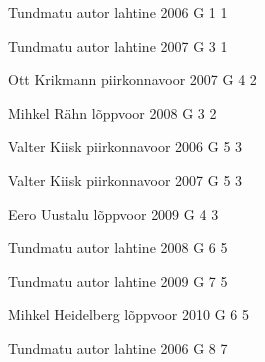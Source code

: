 \documentclass[11pt]{article}
\begin{document}
{Tundmatu autor} %
{lahtine} %
{2006} %
{G 1} %
{1} %
{

\ifEngHint
\fi
}

{Tundmatu autor} %
{lahtine} %
{2007} %
{G 3} %
{1} %
{

\ifEngHint
\fi
}

{Ott Krikmann} %
{piirkonnavoor} %
{2007} %
{G 4} %
{2} %
{

\ifEngHint
\fi
}

{Mihkel Rähn} %
{lõppvoor} %
{2008} %
{G 3} %
{2} %
{

\ifEngHint
\fi
}

{Valter Kiisk} %
{piirkonnavoor} %
{2006} %
{G 5} %
{3} %
{

\ifEngHint
\fi
}

{Valter Kiisk} %
{piirkonnavoor} %
{2007} %
{G 5} %
{3} %
{

\ifEngHint
\fi
}

{Eero Uustalu} %
{lõppvoor} %
{2009} %
{G 4} %
{3} %
{

\ifEngHint
\fi
}

{Tundmatu autor} %
{lahtine} %
{2008} %
{G 6} %
{5} %
{

\ifEngHint
\fi
}

{Tundmatu autor} %
{lahtine} %
{2009} %
{G 7} %
{5} %
{

\ifEngHint
\fi
}

{Mihkel Heidelberg} %
{lõppvoor} %
{2010} %
{G 6} %
{5} %
{

\ifEngHint
\fi
}

{Tundmatu autor} %
{lahtine} %
{2006} %
{G 8} %
{7} %
{

\ifEngHint
\fi
}
\end{document}
